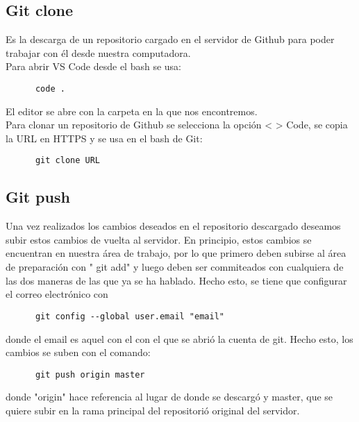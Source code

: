 \documentclass[10pt,oneside]{article}
\begin{document}
\begin{multicols}{2}
  \subsection{Git clone} Es la descarga de un repositorio cargado en el servidor de Github para poder trabajar con él desde nuestra computadora.\\ \newline Para abrir VS Code desde el bash se usa:
  \begin{verbatim}
      code .
  \end{verbatim}
  El editor se abre con la carpeta en la que nos encontremos. \\ \newline Para clonar un repositorio de Github se selecciona la opción < > Code, se copia la URL en HTTPS y se usa en el bash de Git:
  \begin{verbatim}
      git clone URL 
  \end{verbatim}
  \subsection{Git push} Una vez realizados los cambios deseados en el repositorio descargado deseamos subir estos cambios de vuelta al servidor. En principio, estos cambios se encuentran en nuestra área de trabajo, por lo que primero deben subirse al área de preparación con " git add" y luego deben ser commiteados con cualquiera de las dos maneras de las que ya se ha hablado. Hecho esto, se tiene que configurar el correo electrónico con 
  \begin{verbatim}
      git config --global user.email "email"
  \end{verbatim}
  donde el email es aquel con el con el que se abrió la cuenta de git. Hecho esto, los cambios se suben con el comando: \begin{verbatim}
      git push origin master
  \end{verbatim}
  donde "origin" hace referencia al lugar de donde se descargó y master, que se quiere subir en la rama principal del repositorió original del servidor.

\end{multicols}
\end{document}
